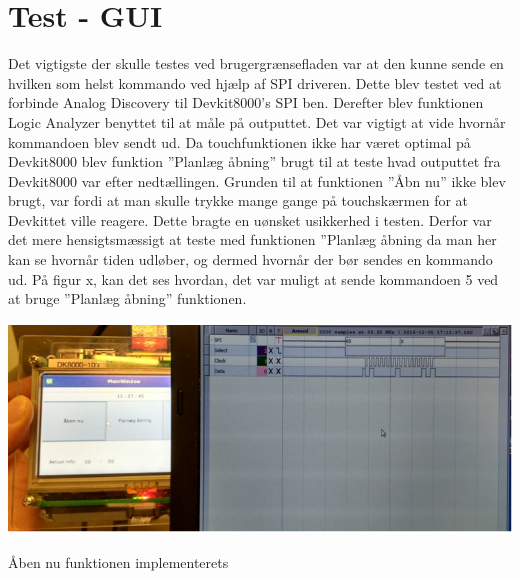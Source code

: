 \section{Test - GUI}

Det vigtigste der skulle testes ved brugergrænsefladen var at den kunne sende en hvilken som helst kommando ved hjælp af SPI driveren. Dette blev testet ved at forbinde Analog Discovery til Devkit8000’s SPI ben. Derefter blev funktionen Logic Analyzer benyttet til at måle på outputtet. Det var vigtigt at vide hvornår kommandoen blev sendt ud. Da touchfunktionen ikke har været optimal på Devkit8000 blev funktion ”Planlæg åbning” brugt til at teste hvad outputtet fra Devkit8000 var efter nedtællingen. Grunden til at funktionen ”Åbn nu” ikke blev brugt, var fordi at man skulle trykke mange gange på touchskærmen for at Devkittet ville reagere. Dette bragte en uønsket usikkerhed i testen. Derfor var det mere hensigtsmæssigt at teste med funktionen ”Planlæg åbning da man her kan se hvornår tiden udløber, og dermed hvornår der bør sendes en kommando ud. På figur x, kan det ses hvordan, det var muligt at sende kommandoen 5 ved at bruge ”Planlæg åbning” funktionen. 

\includegraphics{Billeder/test_GUI}
\caption{Åben nu funktionen implementerets}
